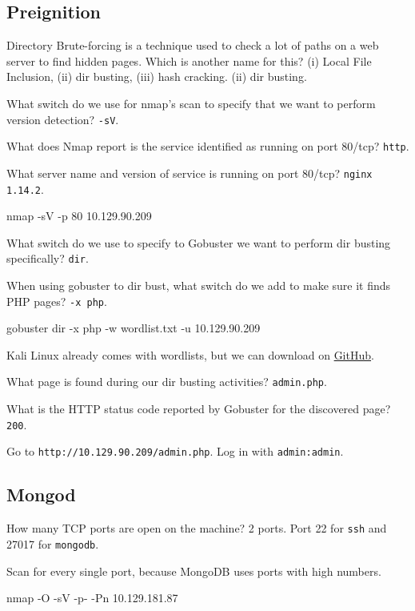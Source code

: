 \documentclass[a4paper,10pt]{article}
\begin{document}
\subsection{Preignition \faLinux}

Directory Brute-forcing is a technique used to check a lot of paths on a web server to find hidden pages. Which is another name for this? (i) Local File Inclusion, (ii) dir busting, (iii) hash cracking. (ii) dir busting.

What switch do we use for nmap's scan to specify that we want to perform version detection? \texttt{-sV}.

What does Nmap report is the service identified as running on port 80/tcp? \texttt{http}.

What server name and version of service is running on port 80/tcp? \texttt{nginx 1.14.2}.
\begin{bash}
nmap -sV -p 80 10.129.90.209
\end{bash}

What switch do we use to specify to Gobuster we want to perform dir busting specifically? \texttt{dir}.

When using gobuster to dir bust, what switch do we add to make sure it finds PHP pages? \texttt{-x php}.
\begin{bash}
gobuster dir -x php -w wordlist.txt -u 10.129.90.209
\end{bash}

Kali Linux already comes with wordlists, but we can download on \href{https://github.com/daviddias/node-dirbuster/blob/master/lists/directory-list-2.3-medium.txt}{GitHub}.

What page is found during our dir busting activities? \texttt{admin.php}.

What is the HTTP status code reported by Gobuster for the discovered page? \texttt{200}.

Go to \texttt{http://10.129.90.209/admin.php}. Log in with \texttt{admin:admin}.

\subsection{Mongod \faLinux}

How many TCP ports are open on the machine? 2 ports. Port 22 for \texttt{ssh} and 27017 for \texttt{mongodb}.

Scan for every single port, because MongoDB uses ports with high numbers.
\begin{bash}
nmap -O -sV -p- -Pn 10.129.181.87
\end{bash}
\end{document}
